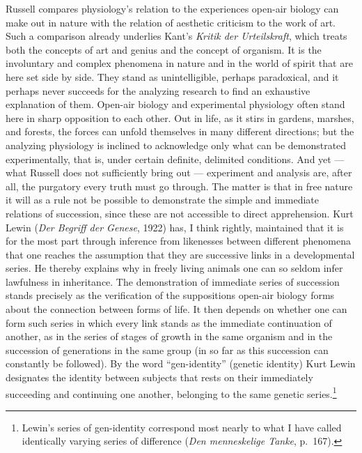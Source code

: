 \documentclass[12pt]{book}
\newcommand{\opage}[1]{\marginnote{\footnotesize\textit{[#1]}}}
\begin{document}
Russell compares physiology's relation to the experiences open-air biology can make out in nature
with the relation of aesthetic criticism to the work of art. Such a comparison already underlies
Kant's \textit{Kritik der Urteilskraft}, which treats both the concepts of art and genius and the
concept of organism. It is the involuntary and complex phenomena in nature and in the world of
spirit that are here set side by side. They stand as unintelligible, perhaps paradoxical, and it
perhaps never succeeds for the analyzing research to find an exhaustive explanation of them.
Open-air biology and experimental physiology often stand here in sharp opposition to each other. Out
in life, as it stirs in gardens, marshes, and forests, the forces can unfold themselves in many
different directions; but the analyzing physiology is inclined to acknowledge only what can be
demonstrated experimentally, that is, under certain definite, delimited conditions. And yet ---
what Russell does not sufficiently bring out --- experiment and analysis are, after all, the
purgatory every truth must go through. The matter is that in free nature it will as a rule not be
possible to demonstrate the simple and immediate relations of succession, since these are not
accessible to direct apprehension. Kurt Lewin (\textit{Der Begriff der Genese}, 1922) has, I think
rightly, maintained that it is for the most part through inference from likenesses between different
phenomena that one reaches the assumption that they are successive links in a developmental series.
He thereby explains why in freely living animals one can so seldom infer lawfulness in inheritance.
The demonstration of immediate series of succession stands precisely as the verification of the
suppositions open-air biology forms about \opage{26}the connection between forms of life. It then depends on
whether one can form such series in which every link stands as the immediate continuation of
another, as in the series of stages of growth in the same organism and in the succession of
generations in the same group (in so far as this succession can constantly be followed). By the word
``gen-identity'' (genetic identity) Kurt Lewin designates the identity between subjects that rests
on their immediately succeeding and continuing one another, belonging to the same genetic
series.\footnote{Lewin's series of gen-identity correspond most nearly to what I have called
identically varying series of difference (\textit{Den menneskelige Tanke}, p.\ 167).}
\end{document}
